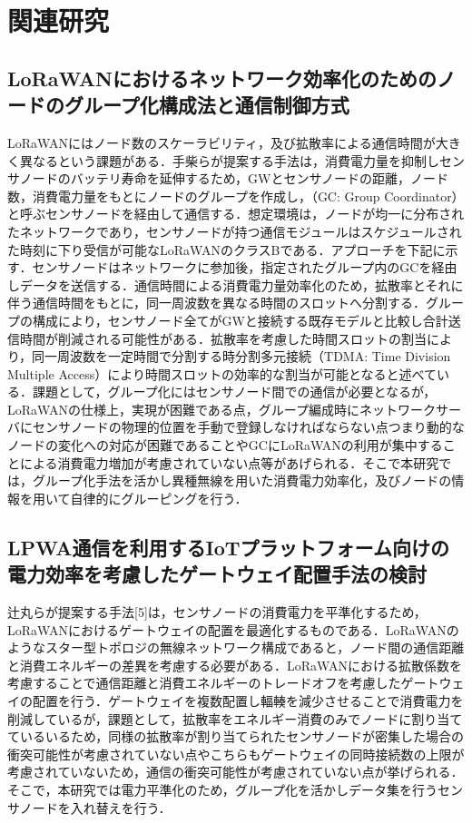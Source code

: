 \chapter{関連研究}

\section{LoRaWANにおけるネットワーク効率化のためのノードのグループ化構成法と通信制御方式}
LoRaWANにはノード数のスケーラビリティ，及び拡散率による通信時間が大きく異なるという課題がある．手柴らが提案する手法\cite{Obana2018}は，消費電力量を抑制しセンサノードのバッテリ寿命を延伸するため，GWとセンサノードの距離，ノード数，消費電力量をもとにノードのグループを作成し，（GC: Group Coordinator）と呼ぶセンサノードを経由して通信する．想定環境は，ノードが均一に分布されたネットワークであり，センサノードが持つ通信モジュールはスケジュールされた時刻に下り受信が可能なLoRaWANのクラスBである．アプローチを下記に示す．センサノードはネットワークに参加後，指定されたグループ内のGCを経由しデータを送信する．通信時間による消費電力量効率化のため，拡散率とそれに伴う通信時間をもとに，同一周波数を異なる時間のスロットへ分割する．グループの構成により，センサノード全てがGWと接続する既存モデルと比較し合計送信時間が削減される可能性がある．拡散率を考慮した時間スロットの割当により，同一周波数を一定時間で分割する時分割多元接続（TDMA: Time Division Multiple Access）により時間スロットの効率的な割当が可能となると述べている．課題として，グループ化にはセンサノード間での通信が必要となるが，LoRaWANの仕様上，実現が困難である点，グループ編成時にネットワークサーバにセンサノードの物理的位置を手動で登録しなければならない点つまり動的なノードの変化への対応が困難であることやGCにLoRaWANの利用が集中することによる消費電力増加が考慮されていない点等があげられる．そこで本研究では，グループ化手法を活かし異種無線を用いた消費電力効率化，及びノードの情報を用いて自律的にグルーピングを行う．

\section{LPWA通信を利用するIoTプラットフォーム向けの電力効率を考慮したゲートウェイ配置手法の検討}
辻丸らが提案する手法[5]は，センサノードの消費電力を平準化するため，LoRaWANにおけるゲートウェイの配置を最適化するものである．LoRaWANのようなスター型トポロジの無線ネットワーク構成であると，ノード間の通信距離と消費エネルギーの差異を考慮する必要がある．LoRaWANにおける拡散係数を考慮することで通信距離と消費エネルギーのトレードオフを考慮したゲートウェイの配置を行う．ゲートウェイを複数配置し輻輳を減少させることで消費電力を削減しているが，課題として，拡散率をエネルギー消費のみでノードに割り当てているいるため，同様の拡散率が割り当てられたセンサノードが密集した場合の衝突可能性が考慮されていない点やこちらもゲートウェイの同時接続数の上限が考慮されていないため，通信の衝突可能性が考慮されていない点が挙げられる．そこで，本研究では電力平準化のため，グループ化を活かしデータ集を行うセンサノードを入れ替えを行う．

